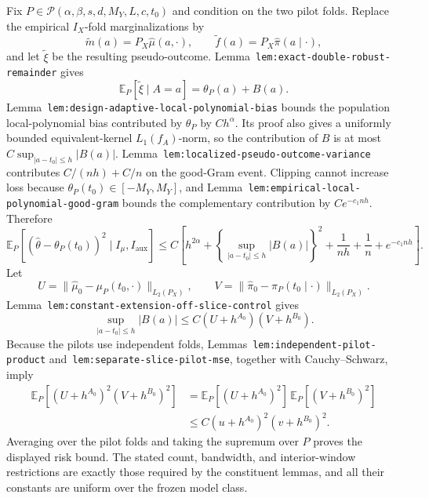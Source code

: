 Fix \(P\in\mathcal P(\alpha,\beta,s,d,M_Y,L,c,t_0)\) and condition on the two pilot folds. Replace the empirical \(I_X\)-fold marginalizations by
\[
\widetilde m(a)=P_X\widehat\mu(a,\cdot),
\qquad
\widetilde f(a)=P_X\widehat\pi(a\mid\cdot),
\]
and let \(\widetilde\xi\) be the resulting pseudo-outcome. Lemma~\texttt{lem:exact-double-robust-remainder} gives
\[
\mathbb E_P[\widetilde\xi\mid A=a]=\theta_P(a)+B(a).
\]
Lemma~\texttt{lem:design-adaptive-local-polynomial-bias} bounds the population local-polynomial bias contributed by \(\theta_P\) by \(Ch^\alpha\). Its proof also gives a uniformly bounded equivalent-kernel \(L_1(f_A)\)-norm, so the contribution of \(B\) is at most \(C\sup_{|a-t_0|\le h}|B(a)|\). Lemma~\texttt{lem:localized-pseudo-outcome-variance} contributes \(C/(nh)+C/n\) on the good-Gram event. Clipping cannot increase loss because \(\theta_P(t_0)\in[-M_Y,M_Y]\), and Lemma~\texttt{lem:empirical-local-polynomial-good-gram} bounds the complementary contribution by \(Ce^{-c_1nh}\). Therefore
\[
\mathbb E_P[(\widehat\theta-\theta_P(t_0))^2\mid I_\mu,I_{\mathrm{aux}}]
\le C\left[h^{2\alpha}+\left\{\sup_{|a-t_0|\le h}|B(a)|\right\}^2+\frac1{nh}+\frac1n+e^{-c_1nh}\right].
\]
Let
\[
U=\|\widehat\mu_0-\mu_P(t_0,\cdot)\|_{L_2(P_X)},
\qquad
V=\|\widehat\pi_0-\pi_P(t_0\mid\cdot)\|_{L_2(P_X)}.
\]
Lemma~\texttt{lem:constant-extension-off-slice-control} gives
\[
\sup_{|a-t_0|\le h}|B(a)|
\le C(U+h^{A_0})(V+h^{B_0}).
\]
Because the pilots use independent folds, Lemmas~\texttt{lem:independent-pilot-product} and~\texttt{lem:separate-slice-pilot-mse}, together with Cauchy--Schwarz, imply
\[
\begin{aligned}
\mathbb E_P[(U+h^{A_0})^2(V+h^{B_0})^2]
&=\mathbb E_P[(U+h^{A_0})^2]\,\mathbb E_P[(V+h^{B_0})^2]\\
&\le C(u+h^{A_0})^2(v+h^{B_0})^2.
\end{aligned}
\]
Averaging over the pilot folds and taking the supremum over \(P\) proves the displayed risk bound. The stated count, bandwidth, and interior-window restrictions are exactly those required by the constituent lemmas, and all their constants are uniform over the frozen model class.